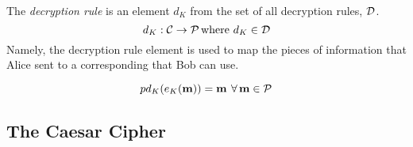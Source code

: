 \begin{definition}\label{def:Decryption_Rule}
  The \emph{decryption rule} is an element $d_{K}$ from the set of all decryption rules, $\operatorname{\mathcal{D}}$.
  \begin{equation}\label{eq:Decryption_Rule}
    d_{K} : \operatorname{\mathcal{C}} \rightarrow \operatorname{\mathcal{P}} \text{where } d_{K} \in \operatorname{\mathcal{D}}
  \end{equation}
  Namely, the decryption rule element is used to map the  pieces of information that Alice sent to a corresponding  that Bob can use.

  \begin{remark}
    \begin{equation}\label{eq:Decrypt_Encryption}
p      d_{K}(e_{K}(\operatorname{\mathbf{m}})) = \operatorname{\mathbf{m}} \: \forall \operatorname{\mathbf{m}} \in \operatorname{\mathcal{P}}
    \end{equation}
  \end{remark}
\end{definition}

\subsection{The Caesar Cipher}\label{subsec:The_Caesar_Cipher}
